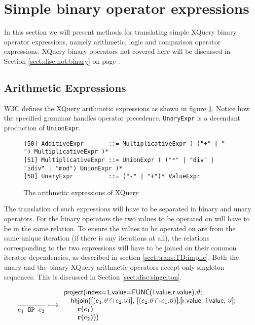 \section{Simple binary operator expressions}
\label{sect:trans:TD:binary}

In this section we will present methods for translating simple XQuery binary
operator expressions, namely arithmetic, logic and comparison operator expressions. XQuery binary operators not covered here will be discussed
in Section \ref{sect:disc:not:binary} on page \pageref{sect:disc:not:binary}.

\subsection{Arithmetic Expressions}
\label{sect:trans:TD:atrith}
W3C defines the XQuery arithmetic expressions as shown in figure
\ref{fig:trans:TD:arithEBNF}\cite{w3c00}. Notice how the specified grammar handles operator precedence. \texttt{UnaryExpr} is a decendant production of \texttt{UnionExpr}.

\begin{figure}[h]
\begin{Verbatim}
[50] AdditiveExpr       ::= MultiplicativeExpr ( ("+" | "-") MultiplicativeExpr )*
[51] MultiplicativeExpr ::= UnionExpr ( ("*" | "div" | "idiv" | "mod") UnionExpr )*
[58] UnaryExpr          ::= ("-" | "+")* ValueExpr
\end{Verbatim}
\caption{The arithmetic expressions of XQuery}
\label{fig:trans:TD:arithEBNF}
\end{figure}

The translation of such expressions will have to be separated in binary and unary operators. For the binary
operators the two values to be operated on will have to be in the same relation. To ensure the values to be
operated on are from the same unique iteration (if there is any iterations at all), the relations corresponding to
the two expressions will have to be joined on their common iterator dependencies, as described in section
\ref{sect:trans:TD:implic}. Both the unary and the binary XQuery arithmetic operators accept only singleton
sequences. This is discussed in Section \ref{sect:disc:singelton}.

\begin{equation}
\frac{}{e_1 \mbox{\texttt{ OP }} e_2}\longmapsto
\begin{array}{l}
\mbox{\textsf{project(index=1,value=FUNC(l.value,r.value),}}\vartheta\mbox{\textsf{;}} \\ \quad
\mbox{\textsf{hhjoin([}}(e_1.\vartheta\cap e_2.\vartheta)\mbox{\textsf{], [}}(e_2.\vartheta\cap e_1.\vartheta)
\mbox{\textsf{],}} 
\mbox{\textsf{[r.value, l.value, }}\vartheta\mbox{\textsf{];}} \\ \quad \quad
\mbox{\textbf{r(}}e_1\mbox{\textbf{)}} \\ \quad \quad
\mbox{\textbf{r(}}e_2\mbox{\textbf{)}\textsf{))}}
\end{array}
\label{rule:trans:TD:arithmetic}
\end{equation}


